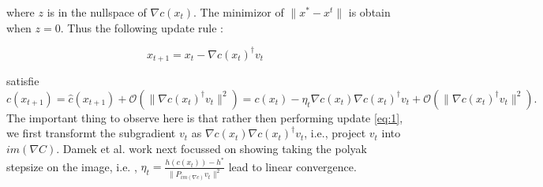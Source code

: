 \documentclass{article}
\begin{document}
where $z$ is in the nullspace of $\nabla c(x_t)$. The minimizor of $\|x^* - x^t\|$ is obtain when $z=0$. Thus the following update rule :

$$
x_{t+1} = x_{t} - \nabla c(x_t)^\dagger v_t
$$


satisfie
$$
c(x_{t+1}) = \hat{c}(x_{t+1}) + \mathcal{O}(\|\nabla c(x_t)^\dagger v_t \|^2) = c(x_t) - \eta_t \nabla c(x_t) \nabla c(x_t)^\dagger v_t + \mathcal{O}(\|\nabla c(x_t)^\dagger v_t \|^2).
$$
The important thing to observe here is that rather then performing update  \ref{eq:1}, we first transformt the subgradient $v_t$ as $\nabla c(x_t) \nabla c(x_t)^\dagger v_t$, i.e., project $v_t$ into $im(\nabla C)$. Damek et al. work next focussed on showing taking the polyak stepsize on the image, i.e. , $\eta_t = \frac{h(c(x_t))-  h^*}{\|P_{im(\nabla c)} v_t \|^2}$ lead to linear convergence.




\end{document}
